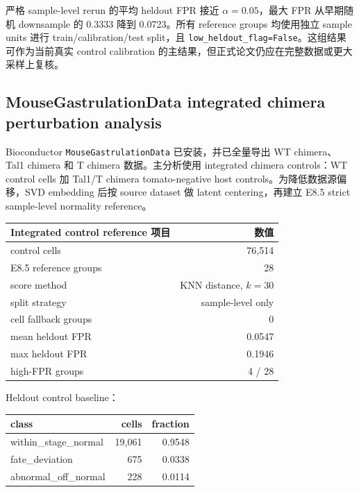 \documentclass[11pt]{article}
\begin{document}
严格 sample-level rerun 的平均 heldout FPR 接近 \(\alpha=0.05\)，最大 FPR 从早期随机 downsample 的 0.3333 降到 0.0723。所有 reference groups 均使用独立 sample units 进行 train/calibration/test split，且 \texttt{low\_heldout\_flag=False}。这组结果可作为当前真实 control calibration 的主结果，但正式论文仍应在完整数据或更大采样上复核。

\subsection*{MouseGastrulationData integrated chimera perturbation analysis}

Bioconductor \texttt{MouseGastrulationData} 已安装，并已全量导出 WT chimera、Tal1 chimera 和 T chimera 数据。主分析使用 integrated chimera controls：WT control cells 加 Tal1/T chimera tomato-negative host controls。为降低数据源偏移，SVD embedding 后按 source dataset 做 latent centering，再建立 E8.5 strict sample-level normality reference。

\begin{center}
\begin{tabular}{lr}
\toprule
Integrated control reference 项目 & 数值 \\
\midrule
control cells & 76,514 \\
E8.5 reference groups & 28 \\
score method & KNN distance, \(k=30\) \\
split strategy & sample-level only \\
cell fallback groups & 0 \\
mean heldout FPR & 0.0547 \\
max heldout FPR & 0.1946 \\
high-FPR groups & 4 / 28 \\
\bottomrule
\end{tabular}
\end{center}

Heldout control baseline：

\begin{center}
\begin{tabular}{lrr}
\toprule
class & cells & fraction \\
\midrule
within\_stage\_normal & 19,061 & 0.9548 \\
fate\_deviation & 675 & 0.0338 \\
abnormal\_off\_normal & 228 & 0.0114 \\
\bottomrule
\end{tabular}
\end{center}
\end{document}
